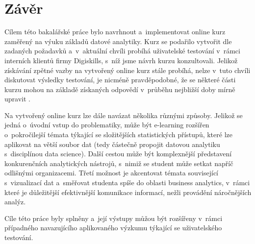 \hypertarget{zuxe1vux11br}{%
\chapter*{Závěr}\label{zaver}}

Cílem této bakalářské práce bylo navrhnout a~implementovat online kurz zaměřený na výuku základů datové analytiky. Kurz se podařilo vytvořit dle zadaných požadavků a~v~aktuální chvíli probíhá uživatelské testování v~rámci interních klientů firmy Digiskills, s~níž jsme návrh kurzu konzultovali. Jelikož získávání zpětné vazby na vytvořený online kurz stále probíhá, nelze v~tuto chvíli diskutovat výsledky testování, je nicméně pravděpodobné, že se některé části kurzu mohou na základě získaných odpovědí v~průběhu nejbližší doby mírně upravit .

Na vytvořený online kurz lze dále navázat několika různými způsoby. Jelikož se jedná o~úvodní vstup do problematiky, může být e-learning rozšířen o~pokročilejší témata týkající se složitějších statistických přístupů, které lze aplikovat na větší soubor dat (tedy částečně propojit datovou analytiku s~disciplínou data science). Další cestou může být komplexnější představení konkurenčních analytických nástrojů, s~nimiž se student může setkat napříč odlišnými organizacemi. Třetí možnost je akcentovat témata související s~vizualizací dat a~směřovat studenta spíše do oblasti business analytics, v~rámci které je důležitější efektivnější komunikace informací, nežli provádění náročnějších analýz.

Cíle této práce byly splněny a~její výstupy můžou být rozšířeny v~rámci případného navazujícího aplikovaného výzkumu týkající se uživatelského testování.
